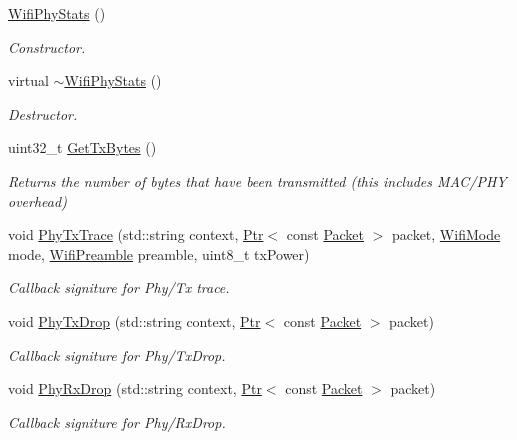 \begin{DoxyCompactItemize}
\item 
\hyperlink{classWifiPhyStats_a4117e7c1646f2174a254d76aa8128973}{Wifi\+Phy\+Stats} ()
\begin{DoxyCompactList}\small\item\em Constructor. \end{DoxyCompactList}\item 
virtual \hyperlink{classWifiPhyStats_a0ebbedba9199ffa9ddb755f33fb2cb89}{$\sim$\+Wifi\+Phy\+Stats} ()
\begin{DoxyCompactList}\small\item\em Destructor. \end{DoxyCompactList}\item 
uint32\+\_\+t \hyperlink{classWifiPhyStats_ab5878680763677fc1f1697d013010e52}{Get\+Tx\+Bytes} ()
\begin{DoxyCompactList}\small\item\em Returns the number of bytes that have been transmitted (this includes M\+A\+C/\+P\+HY overhead) \end{DoxyCompactList}\item 
void \hyperlink{classWifiPhyStats_a75fdca29ad6797328d2a519684ca73fb}{Phy\+Tx\+Trace} (std\+::string context, \hyperlink{classns3_1_1Ptr}{Ptr}$<$ const \hyperlink{classns3_1_1Packet}{Packet} $>$ packet, \hyperlink{classns3_1_1WifiMode}{Wifi\+Mode} mode, \hyperlink{group__wifi_ga5e94a56cb338a14ffbbb19c6a41251eb}{Wifi\+Preamble} preamble, uint8\+\_\+t tx\+Power)
\begin{DoxyCompactList}\small\item\em Callback signiture for Phy/\+Tx trace. \end{DoxyCompactList}\item 
void \hyperlink{classWifiPhyStats_a048093e02ee77d6f6529308b285eae7d}{Phy\+Tx\+Drop} (std\+::string context, \hyperlink{classns3_1_1Ptr}{Ptr}$<$ const \hyperlink{classns3_1_1Packet}{Packet} $>$ packet)
\begin{DoxyCompactList}\small\item\em Callback signiture for Phy/\+Tx\+Drop. \end{DoxyCompactList}\item 
void \hyperlink{classWifiPhyStats_a004c70c37e1a663736dd094fd6703939}{Phy\+Rx\+Drop} (std\+::string context, \hyperlink{classns3_1_1Ptr}{Ptr}$<$ const \hyperlink{classns3_1_1Packet}{Packet} $>$ packet)
\begin{DoxyCompactList}\small\item\em Callback signiture for Phy/\+Rx\+Drop. \end{DoxyCompactList}\end{DoxyCompactItemize}
